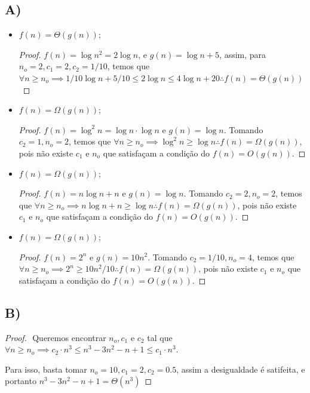 \documentclass{article}
\begin{document}
\subsection*{A)}
\begin{itemize}
  \item $f(n) = \Theta(g(n))$;
  \begin{proof}
  $f(n) = \log{n^2} = 2\log{n}$, e $g(n) = \log{n} +5$, assim, para $n_o=2,c_1 = 2,c_2=1/10$, temos que
  $\forall n\geq n_o \implies 1/10\log{n}+5/10 \leq 2\log{n} \leq 4\log{n} + 20 \therefore f(n) = \Theta(g(n))$
  \end{proof}

  \item
  $f(n) = \Omega(g(n))$;
  \begin{proof}
  $f(n) = \log^2{n} = \log{n}\cdot\log{n}$ e $g(n) = \log{n}$. Tomando $c_2=1,n_o = 2$, temos que
  $\forall n \geq  n_o \implies \log^2{n} \geq  \log{n} \therefore f(n) = \Omega(g(n))$, pois não existe $c_1$ e $n_o$
  que satisfaçam a condição do $f(n) = O(g(n))$.
  \end{proof}

  \item
  $f(n) = \Omega(g(n))$;
  \begin{proof}
  $f(n) = n\log{n} + n$ e $g(n) = \log{n}$. Tomando $c_2=2,n_o = 2$, temos que
  $\forall n \geq  n_o \implies n\log{n} + n \geq  \log{n} \therefore f(n) = \Omega(g(n))$, pois não existe $c_1$ e $n_o$
  que satisfaçam a condição do $f(n) = O(g(n))$.
  \end{proof}

  \item
  $f(n) = \Omega(g(n))$;
  \begin{proof}
  $f(n) = 2^n$ e $g(n) =10n^2$. Tomando $c_2=1/10,n_o = 4$, temos que
  $\forall n \geq  n_o \implies 2^n \geq  10n^2/10 \therefore f(n) = \Omega(g(n))$, pois não existe $c_1$ e $n_o$
  que satisfaçam a condição do $f(n) = O(g(n))$.
  \end{proof}
\end{itemize}

\subsection*{B)}
\begin{proof}
$ $\newline
Queremos encontrar $n_o,c_1$ e $c_2$ tal que $\forall n\geq n_o \implies  c_2 \cdot n^3 \leq n^3-3n^2-n+1\leq c_1 \cdot n^3$.

Para isso, basta tomar $n_o = 10, c_1=2, c_2 = 0.5$, assim a desigualdade é satifeita, e portanto $n^3-3n^2-n+1 = \Theta(n^3)$


\end{proof}
\end{document}
